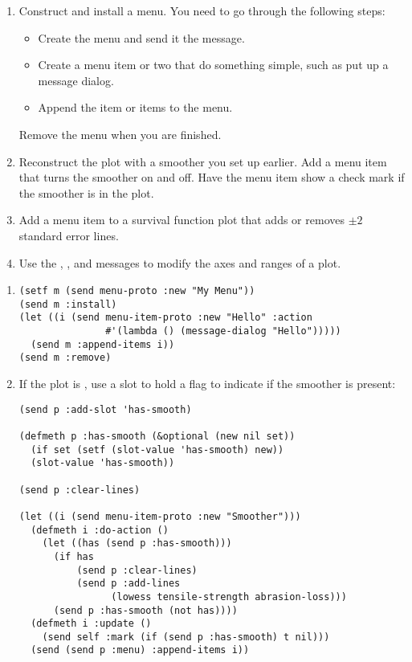 \newpage
{}
\begin{enumerate}
\item
Construct and install a menu. You need to go through the following
steps:
\begin{itemize}
\item
Create the menu and send it the  message.
\item
Create a menu item or two that do something simple, such as put
up a message dialog.
\item
Append the item or items to the menu.
\end{itemize}
Remove the menu when you are finished.

\item
Reconstruct the plot with a smoother you set up earlier. Add a menu
item that turns the smoother on and off. Have the menu item show a
check mark if the smoother is in the plot.

\item
Add a menu item to a survival function plot that adds or removes
$\pm2$ standard error lines.

\item
Use the , , and  messages
to modify the axes and ranges of a plot.
\end{enumerate}

\newpage
{}
\begin{enumerate}
\item
\begin{verbatim}
(setf m (send menu-proto :new "My Menu"))
(send m :install)
(let ((i (send menu-item-proto :new "Hello" :action
               #'(lambda () (message-dialog "Hello")))))
  (send m :append-items i))
(send m :remove)
\end{verbatim}

\item
If the plot is , use a slot to hold a flag to indicate if the
smoother is present:
\begin{verbatim}
(send p :add-slot 'has-smooth)

(defmeth p :has-smooth (&optional (new nil set))
  (if set (setf (slot-value 'has-smooth) new))
  (slot-value 'has-smooth))

(send p :clear-lines)

(let ((i (send menu-item-proto :new "Smoother")))
  (defmeth i :do-action ()
    (let ((has (send p :has-smooth)))
      (if has
          (send p :clear-lines)
          (send p :add-lines
                (lowess tensile-strength abrasion-loss)))
      (send p :has-smooth (not has))))
  (defmeth i :update ()
    (send self :mark (if (send p :has-smooth) t nil)))
  (send (send p :menu) :append-items i))
\end{verbatim}


\end{enumerate}

